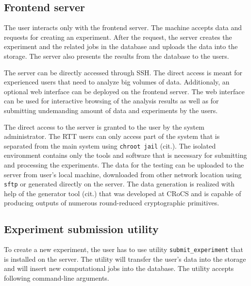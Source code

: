 \documentclass[
  digital,  	%
  color,		%
  oneside,   	%
  12pt,
  nocover,
  notable,
  nolof,
  nolot,
]{fithesis3}
\begin{document}
\subsection{Frontend server}
The user interacts only with the frontend server. The machine accepts data and requests for creating an experiment. After the request, the server creates the experiment and the related jobs in the database and uploads the data into the storage. The server also presents the results from the database to the users.

The server can be directly accessed through SSH. The direct access is meant for experienced users that need to analyze big volumes of data. Additionaly, an optional web interface can be deployed on the frontend server. The web interface can be used for interactive browsing of the analysis results as well as for submitting undemanding amount of data and experiments by the users.

The direct access to the server is granted to the user by the system administrator. The RTT users can only access part of the system that is separated from the main system using \texttt{chroot jail} (cit.). The isolated environment contains only the tools and software that is necessary for submitting and processing the experiments. The data for the testing can be uploaded to the server from user's local machine, downloaded from other network location using \texttt{sftp} or generated directly on the server. The data generation is realized with help of the generator tool (cit.) that was developed at CRoCS and is capable of producing outputs of numerous round-reduced cryptographic primitives.

\subsection*{Experiment submission utility}

To create a new experiment, the user has to use utility \texttt{submit\_experiment} that is installed on the server. The utility will transfer the user's data into the storage and will insert new computational jobs into the database. The utility accepts following command-line arguments.
\end{document}
